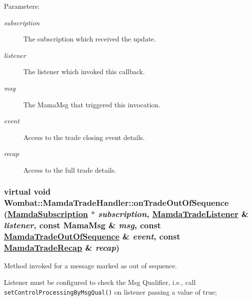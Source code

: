\begin{Desc}
\item[Parameters:]
\begin{description}
\item[{\em subscription}]The subscription which received the update. \item[{\em listener}]The listener which invoked this callback. \item[{\em msg}]The Mama\-Msg that triggered this invocation. \item[{\em event}]Access to the trade closing event details. \item[{\em recap}]Access to the full trade details. \end{description}
\end{Desc}
\hypertarget{classWombat_1_1MamdaTradeHandler_473839f9695a2ae3d41308ac8a223a14}{
\subsubsection[onTradeOutOfSequence]{\setlength{\rightskip}{0pt plus 5cm}virtual void Wombat::Mamda\-Trade\-Handler::on\-Trade\-Out\-Of\-Sequence (\hyperlink{classWombat_1_1MamdaSubscription}{Mamda\-Subscription} $\ast$ {\em subscription}, \hyperlink{classWombat_1_1MamdaTradeListener}{Mamda\-Trade\-Listener} \& {\em listener}, const Mama\-Msg \& {\em msg}, const \hyperlink{classWombat_1_1MamdaTradeOutOfSequence}{Mamda\-Trade\-Out\-Of\-Sequence} \& {\em event}, const \hyperlink{classWombat_1_1MamdaTradeRecap}{Mamda\-Trade\-Recap} \& {\em recap})}}
\label{classWombat_1_1MamdaTradeHandler_473839f9695a2ae3d41308ac8a223a14}


Method invoked for a message marked as out of sequence. 

Listener must be configured to check the Msg Qualifier, i.e., call {\tt set\-Control\-Processing\-By\-Msg\-Qual()} on listener passing a value of true;

